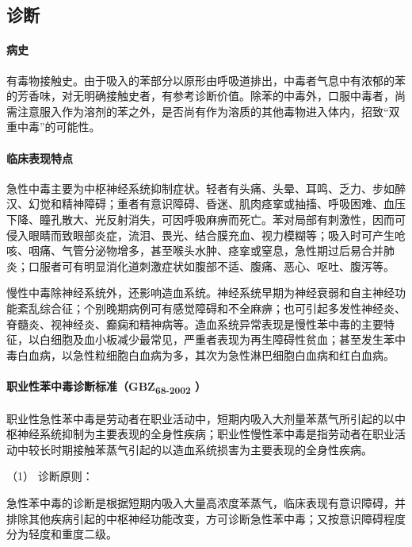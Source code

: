 \subsection{诊断}

\paragraph{病史}

有毒物接触史。由于吸入的苯部分以原形由呼吸道排出，中毒者气息中有浓郁的苯的芳香味，对无明确接触史者，有参考诊断价值。除苯的中毒外，口服中毒者，尚需注意服入作为溶剂的苯之外，是否尚有作为溶质的其他毒物进入体内，招致“双重中毒”的可能性。

\paragraph{临床表现特点}

急性中毒主要为中枢神经系统抑制症状。轻者有头痛、头晕、耳鸣、乏力、步如醉汉、幻觉和精神障碍；重者有意识障碍、昏迷、肌肉痉挛或抽搐、呼吸困难、血压下降、瞳孔散大、光反射消失，可因呼吸麻痹而死亡。苯对局部有刺激性，因而可侵入眼睛而致眼部炎症，流泪、畏光、结合膜充血、视力模糊等；吸入时可产生呛咳、咽痛、气管分泌物增多，甚至喉头水肿、痉挛或窒息，急性期过后易合并肺炎；口服者可有明显消化道刺激症状如腹部不适、腹痛、恶心、呕吐、腹泻等。

慢性中毒除神经系统外，还影响造血系统。神经系统早期为神经衰弱和自主神经功能紊乱综合征；个别晚期病例可有感觉障碍和不全麻痹；也可引起多发性神经炎、脊髓炎、视神经炎、癫痫和精神病等。造血系统异常表现是慢性苯中毒的主要特征，以白细胞及血小板减少最常见，严重者表现为再生障碍性贫血；甚至发生苯中毒白血病，以急性粒细胞白血病为多，其次为急性淋巴细胞白血病和红白血病。

\paragraph{职业性苯中毒诊断标准（GBZ\textsubscript{68-2002} ）}

职业性急性苯中毒是劳动者在职业活动中，短期内吸入大剂量苯蒸气所引起的以中枢神经系统抑制为主要表现的全身性疾病；职业性慢性苯中毒是指劳动者在职业活动中较长时期接触苯蒸气引起的以造血系统损害为主要表现的全身性疾病。

\hypertarget{text00153.htmlux5cux23CHP5-5-3-2-3-1}{}
（1） 诊断原则：

急性苯中毒的诊断是根据短期内吸入大量高浓度苯蒸气，临床表现有意识障碍，并排除其他疾病引起的中枢神经功能改变，方可诊断急性苯中毒；又按意识障碍程度分为轻度和重度二级。

